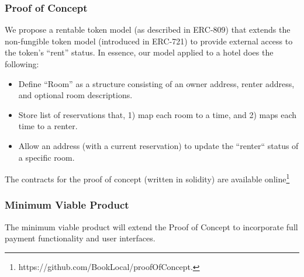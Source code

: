 \documentclass{article}
\begin{document}
\subsubsection{Proof of Concept}

\begin{flushleft}
We propose a rentable token model (as described in ERC-809) that extends the non-fungible token model (introduced in ERC-721) to provide external access to the token's ``rent'' status. In essence, our model applied to a hotel does the following: 

\begin{itemize}
\item Define ``Room'' as a structure consisting of an owner address, renter address, and optional room descriptions. 
\item Store list of reservations that, 1) map each room to a time, and 2) maps each time to a renter. 
\item Allow an address (with a current reservation) to update the ``renter`` status of a specific room. 
\end{itemize} 

The contracts for the proof of concept (written in solidity) are available online\footnote{https://github.com/BookLocal/proofOfConcept.}

\end{flushleft}

\subsubsection{Minimum Viable Product}
The minimum viable product will extend the Proof of Concept to incorporate full payment functionality and user interfaces. 
\end{document}
